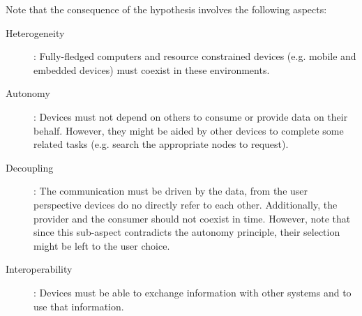 Note that the consequence of the hypothesis involves the following aspects:
\begin{description}
  \item[Heterogeneity]: Fully-fledged computers and resource constrained devices (e.g. mobile and embedded devices) must coexist in these environments.
  \item[Autonomy]: Devices must not depend on others to consume or provide data on their behalf.
                   However, they might be aided by other devices to complete some related tasks (e.g. search the appropriate nodes to request).
  \item[Decoupling]: The communication must be driven by the data, from the user perspective devices do no directly refer to each other.
		    Additionally, the provider and the consumer should not coexist in time.
		    However, note that since this sub-aspect contradicts the autonomy principle, their selection might be left to the user choice.
  \item[Interoperability]: Devices must be able to exchange information with other systems and to use that information. %
\end{description}